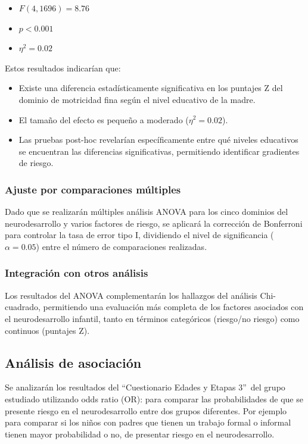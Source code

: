 \documentclass[11pt,letterpaper]{report}
\newcommand{\asq}{“Cuestionario Edades y Etapas 3”}
\begin{document}
\begin{itemize}
    \item $F(4, 1696) = 8.76$
    \item $p < 0.001$
    \item $\eta^2 = 0.02$
\end{itemize}

Estos resultados indicarían que:

\begin{itemize}
    \item Existe una diferencia estadísticamente significativa en los puntajes Z
    del dominio de motricidad fina según el nivel educativo de la madre.
    \item El tamaño del efecto es pequeño a moderado ($\eta^2 = 0.02$).
    \item Las pruebas post-hoc revelarían específicamente entre qué niveles
    educativos se encuentran las diferencias significativas, permitiendo 
    identificar gradientes de riesgo.
\end{itemize}

\subsubsection{Ajuste por comparaciones múltiples}
Dado que se realizarán múltiples análisis ANOVA para los cinco dominios del
neurodesarrollo y varios factores de riesgo, se aplicará la corrección de
Bonferroni para controlar la tasa de error tipo I, dividiendo el nivel de
significancia ($\alpha = 0.05$) entre el número de comparaciones realizadas.

\subsubsection{Integración con otros análisis}
Los resultados del ANOVA complementarán los hallazgos del análisis Chi-cuadrado,
permitiendo una evaluación más completa de los factores asociados con el
neurodesarrollo infantil, tanto en términos categóricos (riesgo/no riesgo) como
continuos (puntajes Z).

\subsection{Análisis de asociación}
Se analizarán los resultados del \asq\ del grupo estudiado utilizando odds
ratio (OR): para comparar las probabilidades de que se presente riesgo en el
neurodesarrollo entre dos grupos diferentes. Por ejemplo para comparar si los
niños con padres que tienen un trabajo formal o informal tienen mayor
probabilidad o no, de presentar riesgo en el neurodesarrollo.
\end{document}
